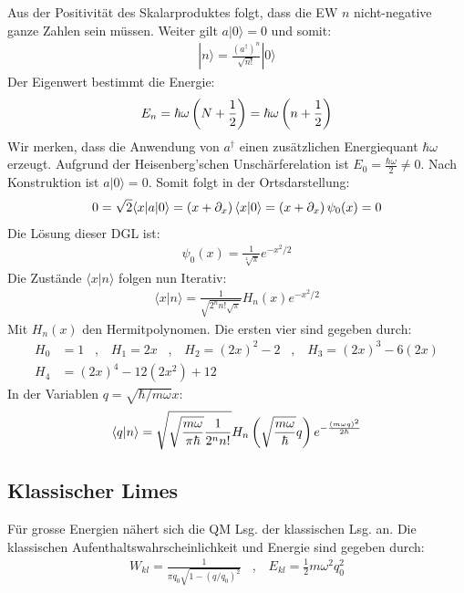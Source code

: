 Aus der Positivität des Skalarproduktes folgt, dass die EW $n$ nicht-negative
ganze Zahlen sein müssen. Weiter gilt $a|0\rangle = 0$ und somit:
\begin{align*}
    |n\rangle = \frac{(a^\dagger)^n}{\sqrt{n!}} |0\rangle
\end{align*}
Der Eigenwert bestimmt die Energie:
\begin{align*}
    E_n = \hbar \omega \left( N + \frac{1}{2} \right) = \hbar \omega \left( n+\frac{1}{2} \right)
\end{align*}
Wir merken, dass die Anwendung von $a^\dagger$ einen zusätzlichen Energiequant
$\hbar \omega$ erzeugt. Aufgrund der Heisenberg'schen Unschärferelation ist
$E_0 = \frac{\hbar \omega}{2} \neq 0$. Nach Konstruktion ist $a|0\rangle = 0$.
Somit folgt in der Ortsdarstellung:
\begin{align*}
    0 = \sqrt{2} \langle x|a|0\rangle = \left( x + \partial_x \right) \langle x|0\rangle
    = \left( x+\partial_x \right) \psi_0 (x) = 0
\end{align*}
Die Lösung dieser DGL ist:
\begin{align*}
    \psi_0 (x) = \frac{1}{\sqrt[4]{\pi}} e^{-x^2/2}
\end{align*}
Die Zustände $\langle x|n\rangle$ folgen nun Iterativ:
\begin{align*}
    \langle x | n \rangle =
    \frac{1}{\sqrt{2^n n! \sqrt{\pi}}} H_n (x) e^{-x^2/2}
\end{align*}
Mit $H_n (x)$ den Hermitpolynomen. Die ersten vier sind gegeben durch:
\begin{align*}
    H_0 &= 1
    \hspace{10pt} , \hspace{10pt}
    H_1 = 2x
    \hspace{10pt} , \hspace{10pt}
    H_2 = (2x)^2 - 2
    \hspace{10pt} , \hspace{10pt}
    H_3 = (2x)^3 - 6 (2x)
    \\
    H_4 &=  (2x)^4 - 12(2x^2) + 12
\end{align*}
In der Variablen $q = \sqrt{\hbar/m \omega}x$:
\begin{align*}
    \langle q | n \rangle = \sqrt{\sqrt{\frac{m \omega}{\pi \hbar}} \frac{1}{2^n n!}} H_n \left( \sqrt{\frac{m \omega}{\hbar}}q \right) e^{- \frac{(m \omega q)^2}{2 \hbar}}
\end{align*}

\subsection{Klassischer Limes}

Für grosse Energien nähert sich die QM Lsg. der klassischen Lsg. an. Die klassischen
Aufenthaltswahrscheinlichkeit und Energie sind gegeben durch:
\begin{align*}
    W_{kl} = \frac{1}{\pi q_0 \sqrt{1 - (q/q_0)^2}}
    \hspace{10pt} , \hspace{10pt}
    E_{kl} = \frac{1}{2} m \omega^2 q_0^2
\end{align*}
